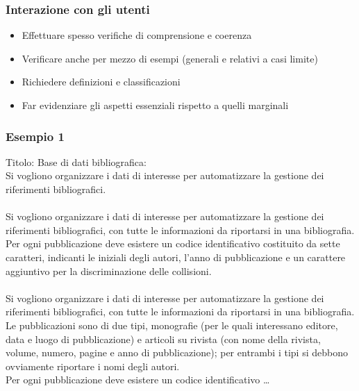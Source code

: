 \documentclass[../main.tex]{subfiles}
\begin{document}
	\subsubsection{Interazione con gli utenti}
	\begin{itemize}
		\item Effettuare spesso verifiche di comprensione e coerenza
		\item Verificare anche per mezzo di esempi (generali e relativi a casi limite)
		\item Richiedere definizioni e classificazioni
		\item Far evidenziare gli aspetti essenziali rispetto a quelli marginali
	\end{itemize}
	\subsubsection{Esempio 1}
	Titolo: Base di dati bibliografica:\\
	Si vogliono organizzare i dati di interesse per automatizzare la gestione dei riferimenti bibliografici.\\\\
	Si vogliono organizzare i dati di interesse per automatizzare la gestione dei riferimenti bibliografici, con tutte le informazioni da riportarsi in una bibliografia. \\
	Per ogni pubblicazione deve esistere un codice identificativo costituito da sette caratteri, indicanti le iniziali degli autori, l'anno di pubblicazione e un carattere aggiuntivo per la discriminazione delle collisioni.\\\\
	Si vogliono organizzare i dati di interesse per automatizzare la gestione dei riferimenti bibliografici, con tutte le informazioni da riportarsi in una bibliografia. \\
	Le pubblicazioni sono di due tipi, monografie (per le quali interessano editore, data e luogo di pubblicazione) e articoli su rivista (con nome della rivista, volume, numero, pagine e anno di pubblicazione); per entrambi i tipi si debbono ovviamente riportare i nomi degli autori. \\
	Per ogni pubblicazione deve esistere un codice identificativo \dots
\end{document}
